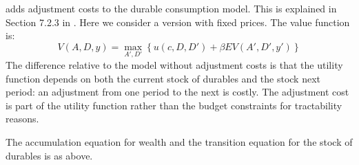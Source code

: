 \citet{bernanke1985adjustment} adds adjustment costs to the durable consumption model. This is explained in Section 7.2.3 in \citet{adda2003dynamic}. Here we consider a version with fixed prices. The value function is:
%
\begin{equation}
	V(A, D, y) = \max_{A', D'} \left\{ u(c, D, D') + \beta EV(A', D', y') \right\}
\end{equation}
%
The difference relative to the model without adjustment costs is that the utility function depends on both the current stock of durables and the stock next period: an adjustment from one period to the next is costly. The adjustment cost is part of the utility function rather than the budget constraints for tractability reasons.

The accumulation equation for wealth and the transition equation for the stock of durables is as above.

